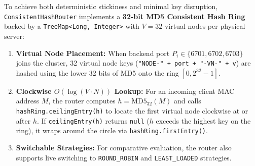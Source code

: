 \documentclass[11pt,a4paper]{article}
\begin{document}
To achieve both deterministic stickiness and minimal key disruption, \texttt{ConsistentHashRouter} implements a \textbf{32-bit MD5 Consistent Hash Ring} backed by a \texttt{TreeMap<Long, Integer>} with $V = 32$ virtual nodes per physical server:
\begin{enumerate}[leftmargin=2em]
    \item \textbf{Virtual Node Placement:} When backend port $P_i \in \{6701, 6702, 6703\}$ joins the cluster, 32 virtual node keys (\texttt{"NODE-" + port + "-VN-" + v}) are hashed using the lower 32 bits of MD5 onto the ring $[0, 2^{32}-1]$.
    \item \textbf{Clockwise $O(\log(V \cdot N))$ Lookup:} For an incoming client MAC address $M$, the router computes $h = \text{MD5}_{32}(M)$ and calls \texttt{hashRing.ceilingEntry(h)} to locate the first virtual node clockwise at or after $h$. If \texttt{ceilingEntry(h)} returns \texttt{null} ($h$ exceeds the highest key on the ring), it wraps around the circle via \texttt{hashRing.firstEntry()}.
    \item \textbf{Switchable Strategies:} For comparative evaluation, the router also supports live switching to \texttt{ROUND\_ROBIN} and \texttt{LEAST\_LOADED} strategies.
\end{enumerate}
\end{document}
